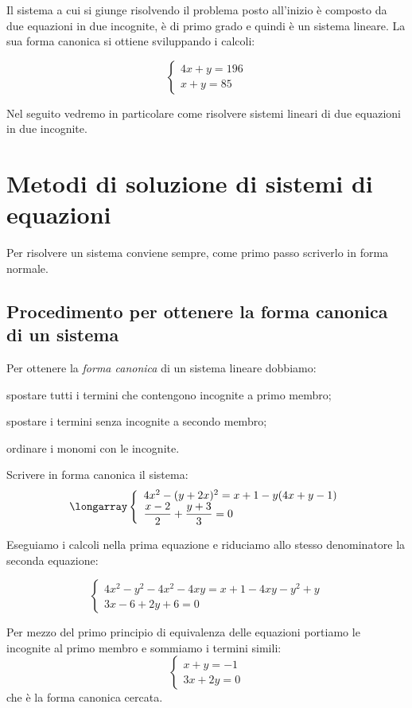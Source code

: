Il sistema a cui si giunge risolvendo il problema posto all'inizio è
composto da due equazioni in due incognite, è di primo grado 
e quindi è un sistema lineare. 
La sua forma canonica si ottiene sviluppando i calcoli:

\[\left\{\begin{array}{l}
4x+y=196\\
x+y=85
\end{array}\right.\]

Nel seguito vedremo in particolare come risolvere sistemi lineari 
di due equazioni in due incognite.

\section{Metodi di soluzione di sistemi di equazioni}
\label{sec:sist_soluzione}

Per risolvere un sistema conviene sempre, come primo passo scriverlo in forma 
normale.

\subsection{Procedimento per ottenere la forma canonica di un sistema}
Per ottenere la \emph{forma canonica} di un sistema lineare dobbiamo:
\begin{enumerate*}
 \item spostare tutti i termini che contengono incognite a primo membro;
 \item spostare i termini senza incognite a secondo membro;
 \item ordinare i monomi con le incognite.
\end{enumerate*}

\begin{exrig}
 \begin{esempio}
 Scrivere in forma canonica il sistema:
\[\longarray\left\{\begin{array}{l}4x^{2}-(y+2x)^{2}=x+1-y(4x+y-1)\\
\dfrac{x-2}{2}+\dfrac{y+3}{3}=0
\end{array}\right.\]

Eseguiamo i calcoli nella prima equazione e riduciamo allo stesso
denominatore la seconda equazione:

\[\left\{\begin{array}{l}
 4x^{2}-y^{2}-4x^{2}-4xy=x+1-4xy-y^{2}+y\\
 3x-6+2y+6=0
 \end{array}\right.\]

Per mezzo del primo principio di equivalenza delle equazioni portiamo le
incognite al primo membro e sommiamo i termini simili:
 \[\left\{\begin{array}{l}
   x+y=-1\\
   3x+2y=0
\end{array}\right.\]
che è la forma canonica cercata.
 \end{esempio}
\end{exrig}


